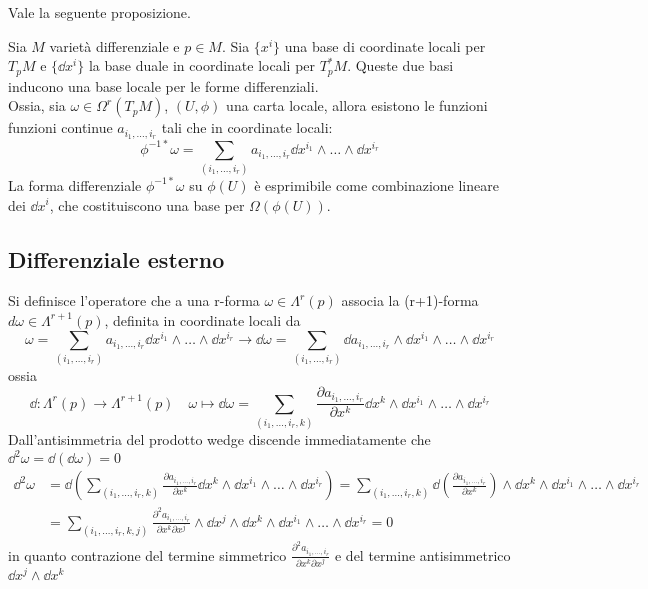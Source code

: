 Vale la seguente proposizione.
\begin{proposition}\label{prop:base2}
   Sia $M$ varietà differenziale e $p \in M$. Sia $\{ x^i \}$ una base di coordinate
   locali per $T_p M$ e $ \{ \dd x^i \}$ la base duale in coordinate locali
   per $T^*_p M$. Queste due basi inducono una base locale per le forme differenziali.\\
   Ossia, sia $\omega \in \Omega^r(T_p M)$, $(U,\phi)$ una carta locale,
   allora esistono le funzioni funzioni continue $a_{i_1,\dots, i_r}$ tali che
   in coordinate locali:
   $$
      \phi^{-1*} \omega = \sum_{(i_1,\dots, i_r)} a_{i_1,\dots, i_r}
         \dd x^{i_1} \wedge \dots \wedge \dd x^{i_r}
   $$
   La forma differenziale $\phi^{-1*}\omega$ su $\phi(U)$ è esprimibile come
   combinazione lineare dei $\dd x^i$, che costituiscono una base per $\Omega(\phi(U))$.
\end{proposition}

\subsection{Differenziale esterno}
Si definisce l'operatore che a una r-forma
$\omega \in \Lambda^r(p)$ associa la (r+1)-forma $d\omega \in \Lambda^{r+1}(p)$,
definita in coordinate locali da\\
$$
   \omega = \sum_{(i_1,\dots, i_r)} a_{i_1,\dots, i_r}
      \dd x^{i_1} \wedge \dots \wedge \dd x^{i_r} \to
   \dd \omega = \sum_{(i_1,\dots, i_r)} \dd a_{i_1,\dots, i_r}\wedge
      \dd x^{i_1} \wedge \dots \wedge \dd x^{i_r}
$$
ossia
$$
   \dd : \Lambda^r(p) \to \Lambda^{r+1}(p) \quad \omega \mapsto
   \dd \omega = \sum_{(i_1,\dots, i_r,k)} \frac {\partial a_{i_1,\dots, i_r}}
   {\partial x^k} \dd x^k \wedge \dd x^{i_1} \wedge \dots \wedge \dd x^{i_r}
$$
Dall'antisimmetria del prodotto wedge discende immediatamente che $\dd ^2\omega
= \dd (\dd \omega) = 0$
\begin{equation*}
   \begin{split}
      \dd ^2\omega & = \dd  \left( \sum_{(i_1,\dots, i_r,k)}
            \frac {\partial a_{i_1,\dots, i_r}}{\partial x^k} \dd x^k
               \wedge \dd x^{i_1} \wedge \dots \wedge \dd x^{i_r} \right)
          = \sum_{(i_1,\dots, i_r,k)}
            \dd \left( \frac {\partial a_{i_1,\dots, i_r}}{\partial x^k} \right)
               \wedge \dd x^k \wedge \dd x^{i_1} \wedge \dots \wedge \dd x^{i_r} \\
       & = \sum_{(i_1,\dots, i_r,k,j)}
            \frac {\partial^2 a_{i_1,\dots, i_r}}{\partial x^k \partial x^j}
               \wedge \dd x^j \wedge \dd x^k \wedge \dd x^{i_1} \wedge \dots \wedge \dd x^{i_r}
         = 0
   \end{split}
\end{equation*}
in quanto contrazione del termine simmetrico $\frac {\partial^2 a_{i_1,\dots, i_r}}
{\partial x^k \partial x^j}$ e del termine antisimmetrico $\dd x^j \wedge \dd x^k $\\

